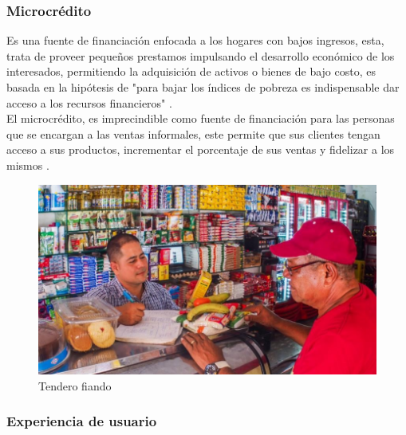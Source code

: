 		\subsubsection{Microcrédito}
		
		{Es una fuente de financiación enfocada a los hogares con bajos ingresos, esta, trata de proveer pequeños prestamos impulsando el desarrollo económico de los interesados, permitiendo la adquisición de activos o bienes de bajo costo, es basada en la hipótesis de "para bajar los índices de pobreza es indispensable dar acceso a los recursos financieros" \cite{MaricruzMicro,BarbaraMicro}.\\
		
		El microcrédito, es imprecindible como fuente de financiación para las personas que se encargan a las ventas informales, este permite que sus clientes tengan acceso a sus productos, incrementar el porcentaje de sus ventas y fidelizar a los mismos \cite{LupeTrust}.\\
	
		\begin{figure}[H]
			\centering
			\includegraphics[width=0.8\linewidth]{description/framework/tendero.jpg}
			\caption{Tendero fiando}
		\end{figure}
		}
	
	
		\subsubsection{Experiencia de usuario}
		

